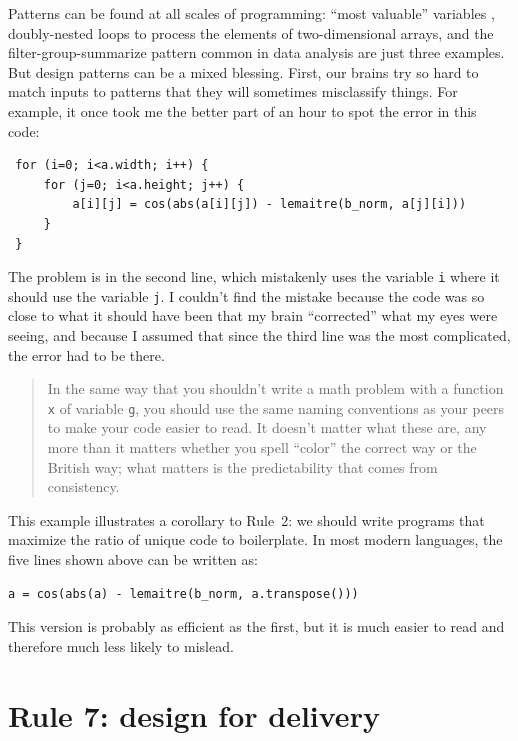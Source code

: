 \documentclass[10pt,letterpaper]{article}
\begin{document}
Patterns can be found at all scales of programming:
``most valuable'' variables \cite{Byckling2005},
doubly-nested loops to process the elements of two-dimensional arrays,
and the filter-group-summarize pattern common in data analysis
are just three examples.
But design patterns can be a mixed blessing.
First,
our brains try so hard to match inputs to patterns that they will sometimes misclassify things.
For example,
it once took me the better part of an hour to spot the error in this code:

\begin{lstlisting}
 for (i=0; i<a.width; i++) {
     for (j=0; i<a.height; j++) {
         a[i][j] = cos(abs(a[i][j]) - lemaitre(b_norm, a[j][i]))
     }
 }
\end{lstlisting}

The problem is in the second line,
which mistakenly uses the variable \texttt{i} where it should use the variable \texttt{j}.
I couldn't find the mistake because
the code was so close to what it should have been that my brain ``corrected'' what my eyes were seeing,
and because I assumed that since the third line was the most complicated,
the error had to be there.

\begin{quotation}
  In the same way that you shouldn't write a math problem with a function \texttt{x} of variable \texttt{g},
  you should use the same naming conventions as your peers
  to make your code easier to read.
  It doesn't matter what these are,
  any more than it matters whether you spell ``color'' the correct way or the British way;
  what matters is the predictability that comes from consistency.
\end{quotation}

This example illustrates a corollary to Rule~2:
we should write programs that maximize the ratio of unique code to boilerplate.
In most modern languages,
the five lines shown above can be written as:

\begin{lstlisting}
a = cos(abs(a) - lemaitre(b_norm, a.transpose()))
\end{lstlisting}

\noindent
This version is probably as efficient as the first,
but it is much easier to read and therefore much less likely to mislead.

\section*{Rule 7: design for delivery}
\end{document}
